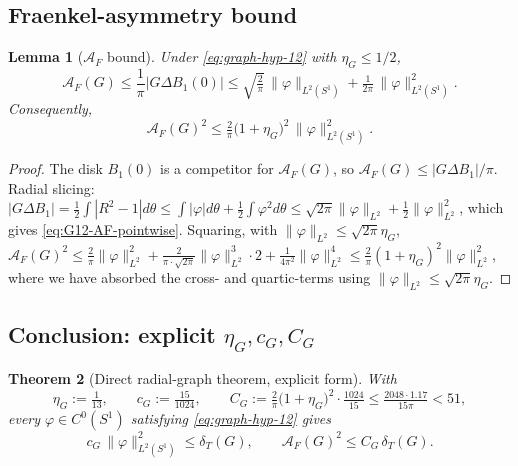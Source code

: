 \documentclass[11pt]{amsart}
\newtheorem{theorem}{Theorem}[section]
\newtheorem{lemma}[theorem]{Lemma}
\newcommand{\dT}{\delta_T}
\newcommand{\AF}{\mathcal A_F}
\begin{document}
\subsection{Fraenkel-asymmetry bound}
\label{ss:G12-fraenkel}

\begin{lemma}[\(\AF\) bound]\label{lem:G12-fraenkel}
Under \eqref{eq:graph-hyp-12} with \(\eta_G\le 1/2\),
\begin{equation}\label{eq:G12-AF-pointwise}
   \AF(G)\le \frac{1}{\pi}|G\Delta B_1(0)|
     \le \sqrt{\tfrac{2}{\pi}}\,\|\varphi\|_{L^2(S^1)}
       +\tfrac{1}{2\pi}\,\|\varphi\|_{L^2(S^1)}^2 .
\end{equation}
Consequently,
\begin{equation}\label{eq:G12-AF-squared}
   \AF(G)^2\le \tfrac{2}{\pi}\bigl(1+\eta_G\bigr)^2\,
     \|\varphi\|_{L^2(S^1)}^2 .
\end{equation}
\end{lemma}

\begin{proof}
The disk \(B_1(0)\) is a competitor for \(\AF(G)\), so
\(\AF(G)\le|G\Delta B_1|/\pi\).  Radial slicing:
\(|G\Delta B_1|=\tfrac12\int|R^2-1|d\theta\le
\int|\varphi|d\theta+\tfrac12\int\varphi^2 d\theta\le
\sqrt{2\pi}\|\varphi\|_{L^2}+\tfrac12\|\varphi\|_{L^2}^2\), which
gives \eqref{eq:G12-AF-pointwise}.  Squaring, with
\(\|\varphi\|_{L^2}\le\sqrt{2\pi}\eta_G\),
\(\AF(G)^2\le\tfrac{2}{\pi}\|\varphi\|_{L^2}^2
  +\tfrac{2}{\pi\cdot\sqrt{2\pi}}\|\varphi\|_{L^2}^3\cdot 2
  +\tfrac{1}{4\pi^2}\|\varphi\|_{L^2}^4
  \le\tfrac{2}{\pi}(1+\eta_G)^2\|\varphi\|_{L^2}^2\),
where we have absorbed the cross- and quartic-terms using
\(\|\varphi\|_{L^2}\le\sqrt{2\pi}\eta_G\).
\end{proof}

\subsection{Conclusion: explicit \(\eta_G,c_G,C_G\)}
\label{ss:G12-conclude}

\begin{theorem}[Direct radial-graph theorem, explicit form]
\label{thm:G12-explicit}
With
\begin{equation}\label{eq:G12-constants}
   \eta_G:=\tfrac{1}{13},
   \qquad
   c_G:=\tfrac{15}{1024},
   \qquad
   C_G:=\tfrac{2}{\pi}\bigl(1+\eta_G\bigr)^2\cdot\tfrac{1024}{15}
       \le \tfrac{2048\cdot 1.17}{15\pi}<51 ,
\end{equation}
every \(\varphi\in C^0(S^1)\) satisfying \eqref{eq:graph-hyp-12}
gives
\[
   c_G\,\|\varphi\|_{L^2(S^1)}^2\le\dT(G),
   \qquad
   \AF(G)^2\le C_G\,\dT(G).
\]
\end{theorem}
\end{document}
